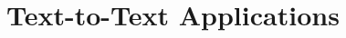 \documentclass[11pt]{article}
\begin{document}


\section{Text-to-Text Applications} \label{adaptation}
\end{document}
